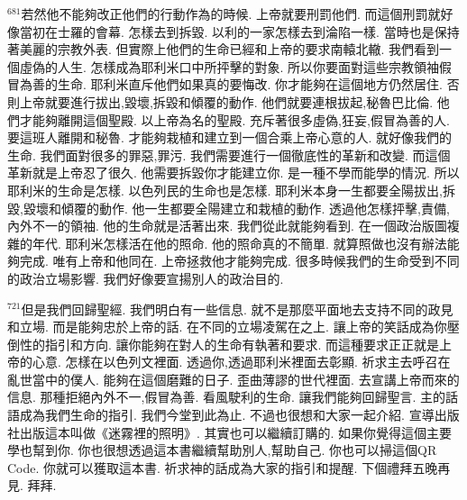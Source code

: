 \documentclass{book}
\begin{document}
$^{681}$若然他不能夠改正他們的行動作為的時候.
上帝就要刑罰他們.
而這個刑罰就好像當初在士羅的會幕.
怎樣去到拆毀.
以利的一家怎樣去到淪陷一樣.
當時也是保持著美麗的宗教外表.
但實際上他們的生命已經和上帝的要求南轅北轍.
我們看到一個虛偽的人生.
怎樣成為耶利米口中所抨擊的對象.
所以你要面對這些宗教領袖假冒為善的生命.
耶利米直斥他們如果真的要悔改.
你才能夠在這個地方仍然居住.
否則上帝就要進行拔出,毀壞,拆毀和傾覆的動作.
他們就要連根拔起,秘魯巴比倫.
他們才能夠離開這個聖殿.
以上帝為名的聖殿.
充斥著很多虛偽,狂妄,假冒為善的人.
要這班人離開和秘魯.
才能夠栽植和建立到一個合乘上帝心意的人.
就好像我們的生命.
我們面對很多的罪惡,罪污.
我們需要進行一個徹底性的革新和改變.
而這個革新就是上帝忍了很久.
他需要拆毀你才能建立你.
是一種不學而能學的情況.
所以耶利米的生命是怎樣.
以色列民的生命也是怎樣.
耶利米本身一生都要全陽拔出,拆毀,毀壞和傾覆的動作.
他一生都要全陽建立和栽植的動作.
透過他怎樣抨擊,責備,內外不一的領袖.
他的生命就是活著出來.
我們從此就能夠看到.
在一個政治版圖複雜的年代.
耶利米怎樣活在他的照命.
他的照命真的不簡單.
就算照做也沒有辦法能夠完成.
唯有上帝和他同在.
上帝拯救他才能夠完成.
很多時候我們的生命受到不同的政治立場影響.
我們好像要宣揚別人的政治目的.

$^{721}$但是我們回歸聖經.
我們明白有一些信息.
就不是那麼平面地去支持不同的政見和立場.
而是能夠忠於上帝的話.
在不同的立場凌駕在之上.
讓上帝的笑話成為你壓倒性的指引和方向.
讓你能夠在對人的生命有執著和要求.
而這種要求正正就是上帝的心意.
怎樣在以色列文裡面.
透過你,透過耶利米裡面去彰顯.
祈求主去呼召在亂世當中的僕人.
能夠在這個磨難的日子.
歪曲薄謬的世代裡面.
去宣講上帝而來的信息.
那種拒絕內外不一,假冒為善.
看風駛利的生命.
讓我們能夠回歸聖言.
主的話語成為我們生命的指引.
我們今堂到此為止.
不過也很想和大家一起介紹.
宣導出版社出版這本叫做《迷霧裡的照明》.
其實也可以繼續訂購的.
如果你覺得這個主要學也幫到你.
你也很想透過這本書繼續幫助別人,幫助自己.
你也可以掃這個QR Code.
你就可以獲取這本書.
祈求神的話成為大家的指引和提醒.
下個禮拜五晚再見.
拜拜.
\newpage

\allsectionsfont{\centering}

\setlength\parindent{0pt}
\setlength{\columnsep}{1.25em}
\setlength{\parfillskip}{0pt}
\setlength{\tabcolsep}{1em}
\raggedbottom



\newfontfamily{}
\newfontfamily{}
\newfontfamily{}
\newfontfamily{}
\newfontfamily{}
\newcommand{\chfont}[1]{\centerfont{\huge\textcolor{hcolor}{#1}}}
\newcommand{\leftcitation}[1]{\leftcitationfont{\Large\textcolor{hcolor}{#1}}}
\newcommand{\rightcitation}[1]{\rightcitationfont{\normalsize\textcolor{rcolor}{#1}}}
\newfontfamily{}
\end{document}
